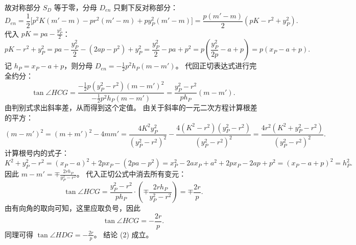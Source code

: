 \begin{solution}
故对称部分 $S_D$ 等于零，分母 $D_{en}$ 只剩下反对称部分：
\[ D_{en} = \frac{1}{2} \big[ p^2 K(m' - m) - p r^2(m' - m) + p y_P^2(m' - m) \big] = \frac{p(m' - m)}{2} (pK - r^2 + y_P^2). \]
代入 $pK = pa - \frac{y_P^2}{2}$：
\[ pK - r^2 + y_P^2 = pa - \frac{y_P^2}{2} - (2ap - p^2) + y_P^2 = \frac{y_P^2}{2} - pa + p^2 = p\left(\frac{y_P^2}{2p} - a + p\right) = p(x_P - a + p). \]
记 $h_P = x_P - a + p$，则分母 $D_{en} = -\frac{1}{2}p^2 h_P (m - m')$。
代回正切表达式进行完全约分：
\[ \tan\angle HCG = \frac{-\frac{1}{2}p(y_P^2 - r^2)(m - m')^2}{-\frac{1}{2}p^2 h_P (m - m')} = \frac{y_P^2 - r^2}{p h_P}(m - m'). \]
由判别式求出斜率差，从而得到这个定值。
由关于斜率的一元二次方程计算根差的平方：
\[ (m - m')^2 = (m + m')^2 - 4m m' = \frac{4K^2 y_P^2}{(y_P^2 - r^2)^2} - \frac{4(K^2 - r^2)(y_P^2 - r^2)}{(y_P^2 - r^2)^2} = \frac{4r^2(K^2 + y_P^2 - r^2)}{(y_P^2 - r^2)^2}. \]
计算根号内的式子：
\[ K^2 + y_P^2 - r^2 = (x_P - a)^2 + 2px_P - (2pa - p^2) = x_P^2 - 2ax_P + a^2 + 2px_P - 2ap + p^2 = (x_P - a + p)^2 = h_P^2. \]
因此 $m - m' = \mp \frac{2r h_P}{y_P^2 - r^2}$。
代入正切公式中消去所有变元：
\[ \tan\angle HCG = \frac{y_P^2 - r^2}{p h_P} \cdot \left( \mp \frac{2r h_P}{y_P^2 - r^2} \right) = \mp \frac{2r}{p}. \]
由有向角的取向可知，这里应取负号，因此
\[
\tan\angle HCG = -\frac{2r}{p}.
\]
同理可得 $\tan\angle HDG = -\frac{2r}{p}$。
结论 (2) 成立。
\end{solution}



